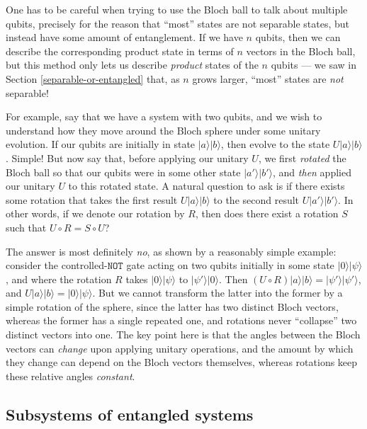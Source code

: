 \documentclass[fleqn]{article}
\begin{document}
One has to be careful when trying to use the Bloch ball to talk about multiple qubits, precisely for the reason that ``most'' states are not separable states, but instead have some amount of entanglement.
If we have \(n\) qubits, then we can describe the corresponding product state in terms of \(n\) vectors in the Bloch ball, but this method only lets us describe \emph{product} states of the \(n\) qubits --- we saw in Section \ref{separable-or-entangled} that, as \(n\) grows larger, ``most'' states are \emph{not} separable!

For example, say that we have a system with two qubits, and we wish to understand how they move around the Bloch sphere under some unitary evolution.
If our qubits are initially in state \(|a\rangle|b\rangle\), then evolve to the state \(U|a\rangle|b\rangle\).
Simple!
But now say that, before applying our unitary \(U\), we first \emph{rotated} the Bloch ball so that our qubits were in some other state \(|a'\rangle|b'\rangle\), and \emph{then} applied our unitary \(U\) to this rotated state.
A natural question to ask is if there exists some rotation that takes the first result \(U|a\rangle|b\rangle\) to the second result \(U|a'\rangle|b'\rangle\).
In other words, if we denote our rotation by \(R\), then does there exist a rotation \(S\) such that \(U\circ R = S\circ U\)?

The answer is most definitely \emph{no}, as shown by a reasonably simple example: consider the controlled-\(\texttt{NOT}\) gate acting on two qubits initially in some state \(|0\rangle|\psi\rangle\), and where the rotation \(R\) takes \(|0\rangle|\psi\rangle\) to \(|\psi'\rangle|0\rangle\).
Then \((U\circ R)|a\rangle|b\rangle=|\psi'\rangle|\psi'\rangle\), and \(U|a\rangle|b\rangle=|0\rangle|\psi\rangle\).
But we cannot transform the latter into the former by a simple rotation of the sphere, since the latter has two distinct Bloch vectors, whereas the former has a single repeated one, and rotations never ``collapse'' two distinct vectors into one.
The key point here is that the angles between the Bloch vectors can \emph{change} upon applying unitary operations, and the amount by which they change can depend on the Bloch vectors themselves, whereas rotations keep these relative angles \emph{constant}.

\hypertarget{subsystems-of-entangled-systems}{%
\subsection{Subsystems of entangled systems}\label{subsystems-of-entangled-systems}}
\end{document}
